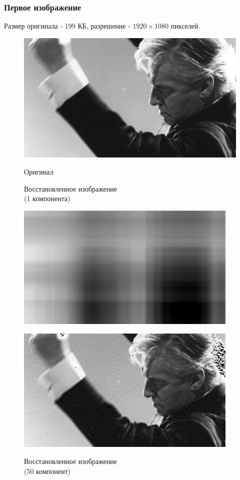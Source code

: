 \documentclass[a4paper]{article}
\begin{document}
\subsubsection{Первое изображение}
Размер оригинала - 199 КБ, разрешение - $1920\times 1080$ пикселей.
\begin{figure}[H]
    \centering
    \caption{Оригинал}
    \includegraphics[width = .5\textwidth]{resources/Herbert_von_Karajan.jpg}
    \label{fig:hvk}
\end{figure}
\begin{figure}[H]
\centering
    \begin{minipage}{.5\textwidth}
    \centering
    \caption{Восстановленное изображение \\(1 компонента)}
    \includegraphics[width = 0.95\textwidth]{reconstructions/with_1comps_Herbert_von_Karajan.jpg}
    \label{fig:hvk_1}
    \end{minipage}%
    \begin{minipage}{.5\textwidth}
    \caption{Восстановленное изображение \\(50 компонент)}
    \includegraphics[width = 0.95\textwidth]{reconstructions/with_50comps_Herbert_von_Karajan.jpg}
    \label{fig:hvk_50}
    \end{minipage}%
\end{figure}
\end{document}
